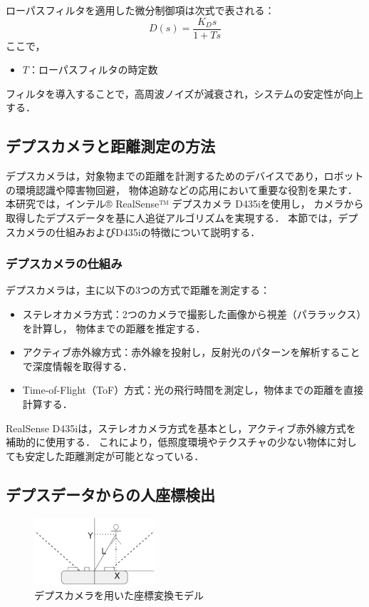 ローパスフィルタを適用した微分制御項は次式で表される：
\begin{equation}
    D(s) = \frac{K_D s}{1 + T s}
    \label{eq:lowpass_filter}
\end{equation}
ここで，
\begin{itemize}
    \item $T$：ローパスフィルタの時定数
\end{itemize}

フィルタを導入することで，高周波ノイズが減衰され，システムの安定性が向上する．

\subsection{デプスカメラと距離測定の方法}
デプスカメラは，対象物までの距離を計測するためのデバイスであり，ロボットの環境認識や障害物回避，
物体追跡などの応用において重要な役割を果たす．
本研究では，インテル® RealSense™ デプスカメラ D435iを使用し，
カメラから取得したデプスデータを基に人追従アルゴリズムを実現する．
本節では，デプスカメラの仕組みおよびD435iの特徴について説明する．

\subsubsection{デプスカメラの仕組み}
デプスカメラは，主に以下の3つの方式で距離を測定する：
\begin{itemize}
    \item ステレオカメラ方式：2つのカメラで撮影した画像から視差（パララックス）を計算し，
          物体までの距離を推定する．
    \item アクティブ赤外線方式：赤外線を投射し，反射光のパターンを解析することで深度情報を取得する．
    \item Time-of-Flight（ToF）方式：光の飛行時間を測定し，物体までの距離を直接計算する．
\end{itemize}

RealSense D435iは，ステレオカメラ方式を基本とし，アクティブ赤外線方式を補助的に使用する．
これにより，低照度環境やテクスチャの少ない物体に対しても安定した距離測定が可能となっている．

\subsection{デプスデータからの人座標検出}

\begin{figure}[h]
    \centering
    \includegraphics[width=0.4\textwidth]{figure/rialsens_man.pdf}
    \caption{デプスカメラを用いた座標変換モデル}
    \label{fig:coordinate_conversion}
\end{figure}

